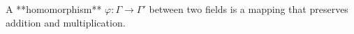 A **homomorphism** $\varphi: \Gamma \to \Gamma'$ between two fields is a mapping that preserves addition and multiplication.
